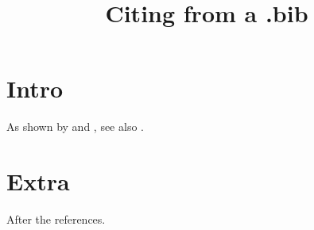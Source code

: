\documentclass{article}
\title{Citing from a .bib}
\begin{document}
\section{Intro}
As shown by \cite{knuth1984} and \citet{lovelace1843}, see also \citep[p.~3]{knuth1984}.




\appendix
\section{Extra}
After the references.
\end{document}
